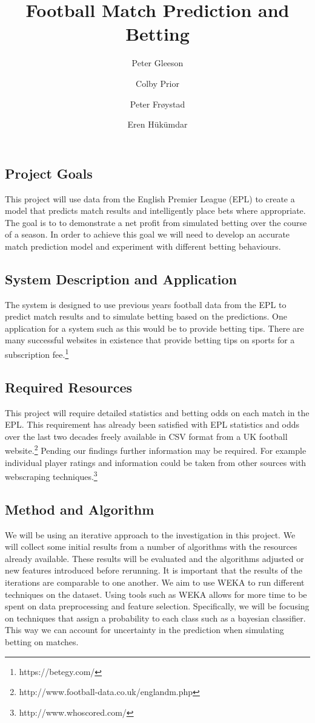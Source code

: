 \documentclass[10pt,twocolumn]{article}
\title{Football Match Prediction and Betting}
\author{Peter Gleeson \and Colby Prior \and Peter Frøystad \and Eren Hükümdar}
\begin{document}
  \maketitle

\subsection{Project Goals}
This project will use data from the English Premier League (EPL) to create a model that predicts match results and intelligently place bets where appropriate. The goal is to to demonstrate a net profit from simulated betting over the course of a season. In order to achieve this goal we will need to develop an accurate match prediction model and experiment with different betting behaviours. 
\subsection{System Description and Application}
The system is designed to use previous years football data from the EPL to predict match results and to simulate betting based on the predictions. One application for a system such as this would be to provide betting tips. There are many successful websites in existence that provide betting tips on sports for a subscription fee.\footnote{https://betegy.com/}
\subsection{Required Resources}
This project will require detailed statistics and betting odds on each match in the EPL. This requirement has already been satisfied with EPL statistics and odds over the last two decades freely available in CSV format from a UK football website.\footnote{http://www.football-data.co.uk/englandm.php} Pending our findings further information may be required. For example individual player ratings and information could be taken from other sources with webscraping techniques.\footnote{http://www.whoscored.com/}
\subsection{Method and Algorithm}
We will be using an iterative approach to the investigation in this project. We will collect some initial results from a number of algorithms with the resources already available. These results will be evaluated and the algorithms adjusted or new features introduced before rerunning. It is important that the results of the iterations are comparable to one another. We aim to use WEKA to run different techniques on the dataset. Using tools such as WEKA allows for more time to be spent on data preprocessing and feature selection. Specifically, we will be focusing on techniques that assign a probability to each class such as a bayesian classifier. This way we can account for uncertainty in the prediction when simulating betting on matches.
\end{document}

